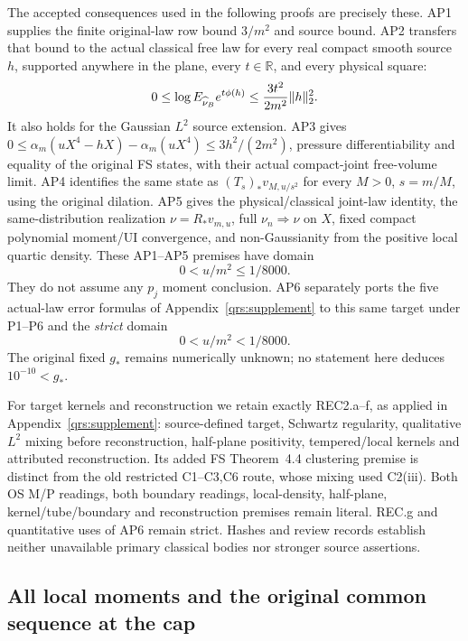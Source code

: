 \documentclass[11pt]{article}
\theoremstyle{plain}
\theoremstyle{definition}
\theoremstyle{remark}
\newcommand{\R}{\mathbb{R}}
\begin{document}
The accepted consequences used in the following proofs are precisely
these. AP1 supplies the finite original-law row bound $3/m^2$ and source
bound. AP2 transfers that bound to the actual classical free law for every
real compact smooth source $h$, supported anywhere in the plane, every
$t\in\R$, and every physical square:
\begin{equation}\label{vqal:AP2}
 0\le\log E_{\widehat\nu_B}e^{t\phi(h)}
          \le {3t^2\over2m^2}\|h\|_2^2.
\end{equation}
It also holds for the Gaussian $L^2$ source extension. AP3 gives
$0\le\alpha_m(uX^4-hX)-\alpha_m(uX^4)\le3h^2/(2m^2)$,
pressure differentiability and equality of the original FS states, with
their actual compact-joint free-volume limit. AP4 identifies the same
state as $(T_s)_*v_{M,u/s^2}$ for every $M>0$, $s=m/M$, using the
original dilation. AP5 gives the physical/classical joint-law identity,
the same-distribution realization $\nu=R_*v_{m,u}$, full
$\nu_n\Rightarrow\nu$ on $X$, fixed compact polynomial moment/UI
convergence, and non-Gaussianity from the positive local quartic density.
These AP1--AP5 premises have domain
\begin{equation}\label{vqal:inclusive}
                         0<u/m^2\le1/8000.
\end{equation}
They do not assume any $p_j$ moment conclusion. AP6 separately ports the
five actual-law error formulas of Appendix~\ref{qrs:supplement} to this
same target under P1--P6 and the \emph{strict} domain
\begin{equation}\label{vqal:strict}
                         0<u/m^2<1/8000.
\end{equation}
The original fixed $g_*$ remains numerically unknown; no statement here
deduces $10^{-10}<g_*$.

For target kernels and reconstruction we retain exactly REC2.a--f, as
applied in Appendix~\ref{qrs:supplement}: source-defined target,
Schwartz regularity, qualitative $L^2$ mixing before reconstruction,
half-plane positivity, tempered/local kernels and attributed reconstruction.
Its added FS Theorem~4.4 clustering premise is distinct from the old
restricted C1--C3,C6 route, whose mixing used C2(iii). Both OS M/P readings,
both boundary readings, local-density, half-plane, kernel/tube/boundary and
reconstruction premises remain literal. REC.g and quantitative uses of
AP6 remain strict. Hashes and review records establish neither unavailable
primary classical bodies nor stronger source assertions.

\subsection{All local moments and the original common sequence at the cap}
\label{vqal:qualitative}
\end{document}
